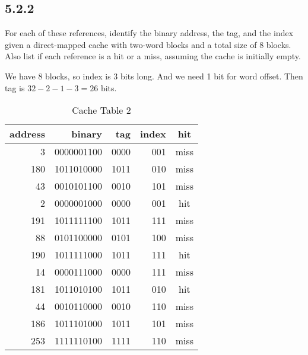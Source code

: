\documentclass[paper=a4, fontsize=11pt]{scrartcl} %
\begin{document}
\pagebreak

\subsection{5.2.2}
\begin{fancyquotes}
    For each of these references, identify the binary address, the tag, and the index given a direct-mapped cache with two-word blocks and a total size of 8 blocks. Also list if each reference is a hit or a miss, assuming the cache is initially empty.
\end{fancyquotes}

We have 8 blocks, so index is 3 bits long. And we need 1 bit for word offset. Then tag is $32-2-1-3=26$ bits.

\begin{table}[H]
    \caption{Cache Table 2}\label{tab:cache_table2}
    \begin{center}
        \begin{tabular}{rrrrc}
        \toprule
        \textbf{address} & \textbf{binary} & \textbf{tag} & \textbf{index} & \textbf{hit} \\
        \midrule
          3 & 0000001100 & 0000 & 001 & miss \\
        180 & 1011010000 & 1011 & 010 & miss \\
         43 & 0010101100 & 0010 & 101 & miss \\
          2 & 0000001000 & 0000 & 001 & hit  \\
        191 & 1011111100 & 1011 & 111 & miss \\
         88 & 0101100000 & 0101 & 100 & miss \\
        190 & 1011111000 & 1011 & 111 & hit  \\
         14 & 0000111000 & 0000 & 111 & miss \\
        181 & 1011010100 & 1011 & 010 & hit  \\
         44 & 0010110000 & 0010 & 110 & miss \\
        186 & 1011101000 & 1011 & 101 & miss \\
        253 & 1111110100 & 1111 & 110 & miss \\
        \bottomrule
        \end{tabular}
    \end{center}
\end{table}
\end{document}

